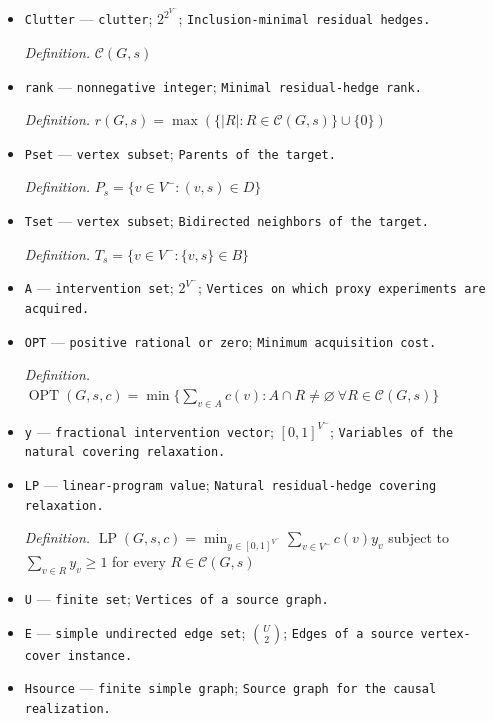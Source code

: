 \documentclass{article}
\begin{document}
\begin{itemize}
  \par\smallskip\noindent\emph{Definition.} \(\mathsf{Hdg}(G,s)\)
  \item \texttt{Clutter} --- \texttt{clutter}; \(2^{2^{V^{-}}}\); \texttt{Inclusion-\allowbreak{}minimal residual hedges.}
  \par\smallskip\noindent\emph{Definition.} \(\mathcal C(G,s)\)
  \item \texttt{rank} --- \texttt{nonnegative integer}; \texttt{Minimal residual-\allowbreak{}hedge rank.}
  \par\smallskip\noindent\emph{Definition.} \(r(G,s)=\max(\{|R|:R\in\mathcal C(G,s)\}\cup\{0\})\)
  \item \texttt{Pset} --- \texttt{vertex subset}; \texttt{Parents of the target.}
  \par\smallskip\noindent\emph{Definition.} \(P_s=\{v\in V^{-}:(v,s)\in D\}\)
  \item \texttt{Tset} --- \texttt{vertex subset}; \texttt{Bidirected neighbors of the target.}
  \par\smallskip\noindent\emph{Definition.} \(T_s=\{v\in V^{-}:\{v,s\}\in B\}\)
  \item \texttt{A} --- \texttt{intervention set}; \(2^{V^{-}}\); \texttt{Vertices on which proxy experiments are acquired.}
  \item \texttt{OPT} --- \texttt{positive rational or zero}; \texttt{Minimum acquisition cost.}
  \par\smallskip\noindent\emph{Definition.} \(\operatorname{OPT}(G,s,c)=\min\{\sum_{v\in A}c(v):A\cap R\neq\varnothing\ \forall R\in\mathcal C(G,s)\}\)
  \item \texttt{y} --- \texttt{fractional intervention vector}; \([0,1]^{V^{-}}\); \texttt{Variables of the natural covering relaxation.}
  \item \texttt{LP} --- \texttt{linear-\allowbreak{}program value}; \texttt{Natural residual-\allowbreak{}hedge covering relaxation.}
  \par\smallskip\noindent\emph{Definition.} \(\operatorname{LP}(G,s,c)=\min_{y\in[0,1]^{V^{-}}}\sum_{v\in V^{-}}c(v)y_v\) subject to \(\sum_{v\in R}y_v\geq1\) for every \(R\in\mathcal C(G,s)\)
  \item \texttt{U} --- \texttt{finite set}; \texttt{Vertices of a source graph.}
  \item \texttt{E} --- \texttt{simple undirected edge set}; \(\binom U2\); \texttt{Edges of a source vertex-\allowbreak{}cover instance.}
  \item \texttt{Hsource} --- \texttt{finite simple graph}; \texttt{Source graph for the causal realization.}

\end{itemize}
\end{document}

